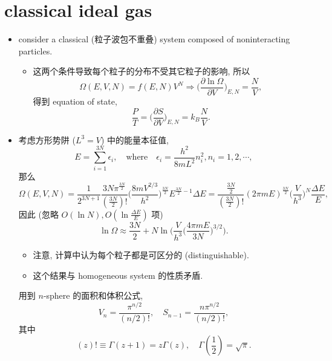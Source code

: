 \section{classical ideal gas}
\begin{itemize}
	\item consider a classical (粒子波包不重叠) system composed of noninteracting particles.
	\begin{itemize}
		\item 这两个条件导致每个粒子的分布不受其它粒子的影响, 所以
		\begin{equation}
			\Omega(E, V, N) = f(E, N) V^N \Longrightarrow \Big( \frac{\partial \ln \Omega}{\partial V} \Big)_{E, N} = \frac{N}{V},
		\end{equation}
		得到 equation of state,
		\begin{equation}
			\frac{P}{T} = \Big( \frac{\partial S}{\partial V} \Big)_{E, N} = k_B \frac{N}{V}.
		\end{equation}
	\end{itemize}
	
	\item 考虑方形势阱 ($L^3 = V$) 中的能量本征值,
	\begin{equation}
		E = \sum_{i = 1}^{3 N} \epsilon_i, \quad \text{where} \quad \epsilon_i = \frac{h^2}{8 m L^2} n_i^2, n_i = 1, 2, \cdots,
	\end{equation}
	那么
	\begin{equation}
		\Omega(E, V, N) = \frac{1}{2^{3 N + 1}} \frac{3 N \pi^{\frac{3 N}{2}}}{(\frac{3 N}{2})!} \Big( \frac{8 m V^{2 / 3}}{h^2} \Big)^{\frac{3 N}{2}} E^{\frac{3 N}{2} - 1} \Delta E = \frac{\frac{3 N}{2}}{(\frac{3 N}{2})!} (2 \pi m E)^{\frac{3 N}{2}} \Big( \frac{V}{h^3} \Big)^N \frac{\Delta E}{E},
	\end{equation}
	因此 (忽略 $O(\ln N), O(\ln \frac{\Delta E}{E})$ 项)
	\begin{equation} \label{1.2.5}
		\ln \Omega \approx \frac{3 N}{2} + N \ln \Big( \frac{V}{h^3} \Big( \frac{4 \pi m E}{3 N} \Big)^{3 / 2} \Big).
	\end{equation}
	\begin{itemize}
		\item 注意, 计算中认为每个粒子都是可区分的 (distinguishable).
		
		\item 这个结果与 homogeneous system 的性质矛盾.
	\end{itemize}
	
	\begin{tcolorbox}[title=calculation:]
		用到 $n$-sphere 的面积和体积公式,
		\begin{equation}
			V_n = \frac{\pi^{n / 2}}{(n / 2)!}, \quad S_{n - 1} = \frac{n \pi^{n / 2}}{(n / 2)!},
		\end{equation}
		其中
		\begin{equation}
			(z)! \equiv \Gamma(z + 1) = z \Gamma(z), \quad \Gamma(\frac{1}{2}) = \sqrt{\pi}.
		\end{equation}
		

\end{tcolorbox}
\end{itemize}
